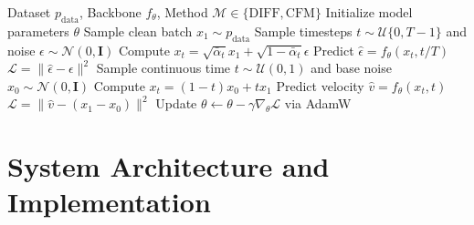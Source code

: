 \documentclass[conference]{IEEEtran}
\begin{document}
\begin{algorithm}[t]
\caption{Training Baseline Models (Diffusion vs. Flow Matching)}
\label{alg:training_comparison}
\begin{algorithmic}[1]
\REQUIRE Dataset $p_{\text{data}}$, Backbone $f_\theta$, Method $\mathcal{M} \in \{\text{DIFF}, \text{CFM}\}$
\STATE Initialize model parameters $\theta$
\REPEAT
    \STATE Sample clean batch $x_1 \sim p_{\text{data}}$
        \STATE Sample timesteps $t \sim \mathcal{U}\{0, T-1\}$ and noise $\epsilon \sim \mathcal{N}(0, \mathbf{I})$
        \STATE Compute $x_t = \sqrt{\bar{\alpha}_t} x_1 + \sqrt{1 - \bar{\alpha}_t} \epsilon$
        \STATE Predict $\hat{\epsilon} = f_\theta(x_t, t/T)$
        \STATE $\mathcal{L} = \|\hat{\epsilon} - \epsilon\|^2$
        \STATE Sample continuous time $t \sim \mathcal{U}(0, 1)$ and base noise $x_0 \sim \mathcal{N}(0, \mathbf{I})$
        \STATE Compute $x_t = (1 - t) x_0 + t x_1$
        \STATE Predict velocity $\hat{v} = f_\theta(x_t, t)$
        \STATE $\mathcal{L} = \|\hat{v} - (x_1 - x_0)\|^2$
    \ENDIF
    \STATE Update $\theta \leftarrow \theta - \gamma \nabla_\theta \mathcal{L}$ via AdamW
\end{algorithmic}
\end{algorithm}

\section{System Architecture and Implementation}
\end{document}
